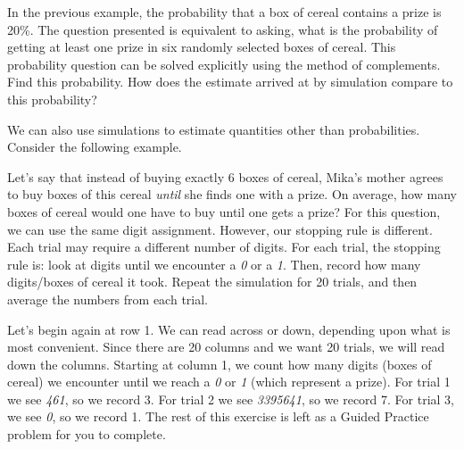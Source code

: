 \begin{exercisewrap}
\begin{nexercise}In the previous example, the probability that a box of cereal contains a prize is 20\%. The question presented is equivalent to asking, what is the probability of getting at least one prize in six randomly selected boxes of cereal. This probability question can be solved explicitly using the method of complements. Find this probability. How does the estimate arrived at by simulation compare to this probability?\footnotemark
\end{nexercise}
\end{exercisewrap}

We can also use simulations to estimate quantities other than probabilities. Consider the following example.

\D{\newpage}

\begin{examplewrap}
\begin{nexample}{Let's say that instead of buying exactly 6 boxes of cereal, Mika's mother agrees to buy boxes of this cereal \emph{until} she finds one with a prize. On average, how many boxes of cereal would one have to buy until one gets a prize?}
For this question, we can use the same digit assignment. However, our stopping rule is different. Each trial may require a different number of digits. For each trial, the stopping rule is:  look at digits until we encounter a \emph{0} or a \emph{1}. Then, record how many digits/boxes of cereal it took. Repeat the simulation for 20 trials, and then average the numbers from each trial.

Let's begin again at row 1. We can read across or down, depending upon what is most convenient. Since there are 20 columns and we want 20 trials, we will read down the columns. Starting at column 1, we count how many digits (boxes of cereal) we encounter until we reach a \emph{0} or \emph{1} (which represent a prize). For trial 1 we see \emph{461}, so we record 3. For trial 2 we see \emph{3395641}, so we record 7. For trial 3, we see \emph{0}, so we record 1. The rest of this exercise is left as a Guided Practice problem for you to complete.
\end{nexample}
\end{examplewrap}

